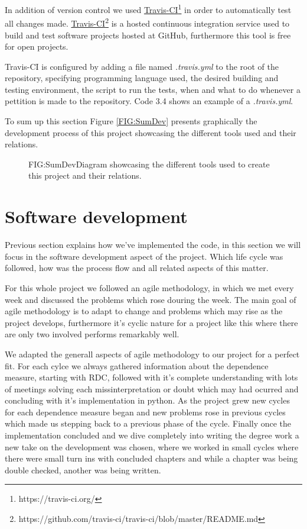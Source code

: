 In addition of version control we used \href{https://travis-ci.org/}{Travis-CI}\footnote{https://travis-ci.org/} in order to automatically test all changes made. \href{https://github.com/travis-ci/travis-ci/blob/master/README.md}{Travis-CI}\footnote{https://github.com/travis-ci/travis-ci/blob/master/README.md} is a hosted continuous integration service used to build and test software projects hosted at GitHub, furthermore this tool is free for open projects.

Travis-CI is configured by adding a file named \textit{.travis.yml} to the root of the repository, specifying programming language used, the desired building and testing environment, the script to run the tests, when and what to do whenever a pettition is made to the repository. Code 3.4 shows an example of a \textit{.travis.yml}.

\label{CODE:TRAVIS}


To sum up this section Figure \ref{FIG:SumDev} presents graphically the development process of this project showcasing the different tools used and their relations.

\begin{figure}[Summary of the implementation process]{FIG:SumDev}{Diagram showcasing the different tools used to create this project and their relations.}
\end{figure}
\FloatBarrier
\section{Software development}

Previous section explains how we've implemented the code, in this section we will focus in the software development aspect of the project. Which life cycle was followed, how was the process flow and all related aspects of this matter.

For this whole project we followed an agile methodology, in which we met every week and discussed the problems which rose douring the week. The main goal of agile methodology is to adapt to change and problems which may rise as the project develops, furthermore it's cyclic nature for a project like this where there are only two involved performs remarkably well. 

We adapted the generall aspects of agile methodology to our project for a perfect fit. For each cylce we always gathered information about the dependence measure, starting with RDC, followed with it's complete understanding with lots of meetings solving each missinterpretation or doubt which may had ocurred and concluding with it's implementation in python.  As the project grew new cycles for each dependence measure began and new problems rose in previous cycles which made us stepping back to a previous phase of the cycle. Finally once the implementation concluded and we dive completely into writing the degree work a new take on the development was chosen, where we worked in small cycles where there were small turn ins with concluded chapters and while a chapter was being double checked, another was being written.

